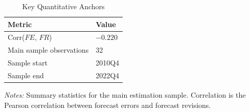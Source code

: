 \begin{table}[!htbp]
\centering
\small
\caption{Key Quantitative Anchors}
\label{tab:key_numbers}
\begin{threeparttable}

\begin{tabular}{ll}
\toprule
Metric & Value \\
\midrule
Corr($FE$, $FR$) & $-0.220$ \\
Main sample observations & 32 \\
Sample start & 2010Q4 \\
Sample end & 2022Q4 \\
\bottomrule
\end{tabular}
\begin{tablenotes}[flushleft]
\footnotesize
\item \textit{Notes:} Summary statistics for the main estimation sample. Correlation is the Pearson correlation between forecast errors and forecast revisions.
\end{tablenotes}
\end{threeparttable}
\end{table}
